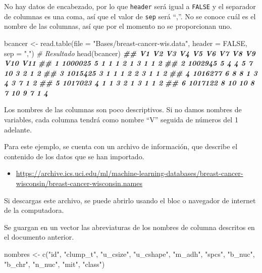 \documentclass[
]{book}
\newenvironment{Shaded}{\begin{snugshade}}{\end{snugshade}}
\newcommand{\AttributeTok}[1]{\textcolor[rgb]{0.77,0.63,0.00}{#1}}
\newcommand{\CommentTok}[1]{\textcolor[rgb]{0.56,0.35,0.01}{\textit{#1}}}
\newcommand{\ConstantTok}[1]{\textcolor[rgb]{0.00,0.00,0.00}{#1}}
\newcommand{\DocumentationTok}[1]{\textcolor[rgb]{0.56,0.35,0.01}{\textbf{\textit{#1}}}}
\newcommand{\FunctionTok}[1]{\textcolor[rgb]{0.00,0.00,0.00}{#1}}
\newcommand{\NormalTok}[1]{#1}
\newcommand{\OtherTok}[1]{\textcolor[rgb]{0.56,0.35,0.01}{#1}}
\newcommand{\StringTok}[1]{\textcolor[rgb]{0.31,0.60,0.02}{#1}}
\providecommand{\tightlist}{%
  \setlength{\itemsep}{0pt}\setlength{\parskip}{0pt}}
\begin{document}
No hay datos de encabezado, por lo que \texttt{header} será igual a \texttt{FALSE} y el separador de columnas es una coma, así que el valor de \texttt{sep} será ``,''. No se conoce cuál es el nombre de las columnas, así que por el momento no se proporcionan uno.

\begin{Shaded}
\begin{Highlighting}[]
\NormalTok{bcancer }\OtherTok{\textless{}{-}} \FunctionTok{read.table}\NormalTok{(}\AttributeTok{file =} \StringTok{"Bases/breast{-}cancer{-}wis.data"}\NormalTok{, }\AttributeTok{header =} \ConstantTok{FALSE}\NormalTok{, }\AttributeTok{sep =} \StringTok{","}\NormalTok{)}
\CommentTok{\# Resultado}
\FunctionTok{head}\NormalTok{(bcancer)}
\DocumentationTok{\#\#        V1 V2 V3 V4 V5 V6 V7 V8 V9 V10 V11}
\DocumentationTok{\#\# 1 1000025  5  1  1  1  2  1  3  1   1   2}
\DocumentationTok{\#\# 2 1002945  5  4  4  5  7 10  3  2   1   2}
\DocumentationTok{\#\# 3 1015425  3  1  1  1  2  2  3  1   1   2}
\DocumentationTok{\#\# 4 1016277  6  8  8  1  3  4  3  7   1   2}
\DocumentationTok{\#\# 5 1017023  4  1  1  3  2  1  3  1   1   2}
\DocumentationTok{\#\# 6 1017122  8 10 10  8  7 10  9  7   1   4}
\end{Highlighting}
\end{Shaded}

Los nombres de las columnas son poco descriptivos. Si no damos nombres de variables, cada columna tendrá como nombre ``V'' seguida de números del 1 adelante.

Para este ejemplo, se cuenta con un archivo de información, que describe el contenido de los datos que se han importado.

\begin{itemize}
\tightlist
\item
  \url{https://archive.ics.uci.edu/ml/machine-learning-databases/breast-cancer-wisconsin/breast-cancer-wisconsin.names}
\end{itemize}

Si descargas este archivo, se puede abrirlo usando el bloc o navegador de internet de la computadora.

Se guargan en un vector las abreviaturas de los nombres de columna descritos en el documento anterior.

\begin{Shaded}
\begin{Highlighting}[]
\NormalTok{nombres }\OtherTok{\textless{}{-}} \FunctionTok{c}\NormalTok{(}\StringTok{"id"}\NormalTok{, }\StringTok{"clump\_t"}\NormalTok{, }\StringTok{"u\_csize"}\NormalTok{, }\StringTok{"u\_cshape"}\NormalTok{, }\StringTok{"m\_adh"}\NormalTok{, }\StringTok{"spcs"}\NormalTok{, }\StringTok{"b\_nuc"}\NormalTok{, }
             \StringTok{"b\_chr"}\NormalTok{, }\StringTok{"n\_nuc"}\NormalTok{, }\StringTok{"mit"}\NormalTok{, }\StringTok{"class"}\NormalTok{)}
\end{Highlighting}
\end{Shaded}
\end{document}
